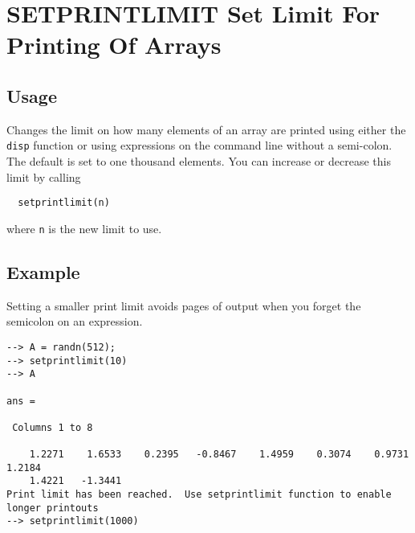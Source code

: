 \section{SETPRINTLIMIT Set Limit For Printing Of Arrays}

\subsection{Usage}

Changes the limit on how many elements of an array are printed
using either the \verb|disp| function or using expressions on the
command line without a semi-colon.  The default is set to 
one thousand elements.  You can increase or decrease this
limit by calling
\begin{verbatim}
  setprintlimit(n)
\end{verbatim}
where \verb|n| is the new limit to use.
\subsection{Example}

Setting a smaller print limit avoids pages of output when you forget the semicolon on an expression.
\begin{verbatim}
--> A = randn(512);
--> setprintlimit(10)
--> A

ans = 

 Columns 1 to 8

    1.2271    1.6533    0.2395   -0.8467    1.4959    0.3074    0.9731    1.2184 
    1.4221   -1.3441
Print limit has been reached.  Use setprintlimit function to enable longer printouts
--> setprintlimit(1000)
\end{verbatim}
